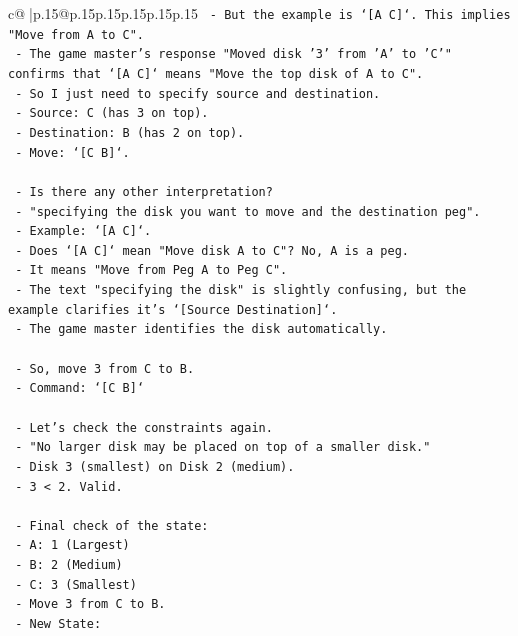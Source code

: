 \documentclass{article}
\begin{document}
{\begin{supertabular}{c@{$\;$}|p{.15\linewidth}@{}p{.15\linewidth}p{.15\linewidth}p{.15\linewidth}p{.15\linewidth}p{.15\linewidth}}
{{{\texttt{  {-} But the example is `{[}A C{]}`. This implies "Move from A to C".} \\
\texttt{  {-} The game master's response "Moved disk '3' from 'A' to 'C'" confirms that `{[}A C{]}` means "Move the top disk of A to C".} \\
\texttt{  {-} So I just need to specify source and destination.} \\
\texttt{  {-} Source: C (has 3 on top).} \\
\texttt{  {-} Destination: B (has 2 on top).} \\
\texttt{  {-} Move: `{[}C B{]}`.} \\
\\ 
\texttt{  {-} Is there any other interpretation?} \\
\texttt{  {-} "specifying the disk you want to move and the destination peg".} \\
\texttt{  {-} Example: `{[}A C{]}`.} \\
\texttt{  {-} Does `{[}A C{]}` mean "Move disk A to C"? No, A is a peg.} \\
\texttt{  {-} It means "Move from Peg A to Peg C".} \\
\texttt{  {-} The text "specifying the disk" is slightly confusing, but the example clarifies it's `{[}Source Destination{]}`.} \\
\texttt{  {-} The game master identifies the disk automatically.} \\
\\ 
\texttt{  {-} So, move 3 from C to B.} \\
\texttt{  {-} Command: `{[}C B{]}`} \\
\\ 
\texttt{  {-} Let's check the constraints again.} \\
\texttt{  {-} "No larger disk may be placed on top of a smaller disk."} \\
\texttt{  {-} Disk 3 (smallest) on Disk 2 (medium).} \\
\texttt{  {-} 3 < 2. Valid.} \\
\\ 
\texttt{  {-} Final check of the state:} \\
\texttt{  {-} A: 1 (Largest)} \\
\texttt{  {-} B: 2 (Medium)} \\
\texttt{  {-} C: 3 (Smallest)} \\
\texttt{  {-} Move 3 from C to B.} \\
\texttt{  {-} New State:} \\
}}}
\end{supertabular}}
\end{document}
